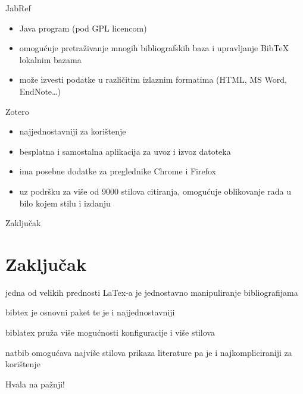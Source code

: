 \documentclass{beamer}
\begin{document}
 

\begin{frame}{JabRef}
\begin{itemize}
	\item Java program (pod GPL licencom) \\
	\item omogućuje pretraživanje mnogih bibliografskih baza i upravljanje
	BibTeX lokalnim bazama  \\
	\item može izvesti podatke u različitim izlaznim formatima (HTML, MS Word, EndNote…) \\
\end{itemize}
 \end{frame}

 
\begin{frame}{Zotero}
\begin{itemize}
	\item najjednostavniji za korištenje  \\
	\item besplatna i samostalna aplikacija za uvoz i izvoz datoteka \\
	\item ima posebne dodatke za preglednike Chrome i Firefox \\
	\item uz podršku za više od 9000 stilova citiranja, omogućuje oblikovanje
	 rada u bilo kojem stilu i izdanju \\
\end{itemize}
 \end{frame}


\begin{frame}{Zaključak}
\section{Zaključak}
	\item jedna od velikih prednosti LaTex-a je jednostavno manipuliranje bibliografijama \\
	\item bibtex je osnovni paket te je i najjednostavniji \\
	\item biblatex pruža više mogućnosti konfiguracije i više stilova \\
	\item natbib omogućava najviše stilova prikaza literature pa je i najkompliciraniji za korištenje \\
\end{frame}

\begin{frame}
Hvala na pažnji!
\end{frame}
\end{document}
